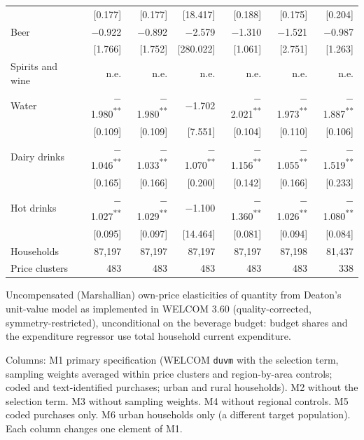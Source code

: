 \begin{table}[!htbp]
\begin{threeparttable}
\begin{tabular}{lrrrrrr}
 & [0.177] & [0.177] & [18.417] & [0.188] & [0.175] & [0.204] \\
Beer & $-$0.922 & $-$0.892 & $-$2.579 & $-$1.310 & $-$1.521 & $-$0.987 \\
 & [1.766] & [1.752] & [280.022] & [1.061] & [2.751] & [1.263] \\
Spirits and wine & n.e. & n.e. & n.e. & n.e. & n.e. & n.e. \\
Water & $-$1.980\textsuperscript{**} & $-$1.980\textsuperscript{**} & $-$1.702 & $-$2.021\textsuperscript{**} & $-$1.973\textsuperscript{**} & $-$1.887\textsuperscript{**} \\
 & [0.109] & [0.109] & [7.551] & [0.104] & [0.110] & [0.106] \\
Dairy drinks & $-$1.046\textsuperscript{**} & $-$1.033\textsuperscript{**} & $-$1.070\textsuperscript{**} & $-$1.156\textsuperscript{**} & $-$1.055\textsuperscript{**} & $-$1.519\textsuperscript{**} \\
 & [0.165] & [0.166] & [0.200] & [0.142] & [0.166] & [0.233] \\
Hot drinks & $-$1.027\textsuperscript{**} & $-$1.029\textsuperscript{**} & $-$1.100 & $-$1.360\textsuperscript{**} & $-$1.026\textsuperscript{**} & $-$1.080\textsuperscript{**} \\
 & [0.095] & [0.097] & [14.464] & [0.081] & [0.094] & [0.084] \\
\addlinespace
Households & 87,197 & 87,197 & 87,197 & 87,197 & 87,198 & 81,437 \\
Price clusters & 483 & 483 & 483 & 483 & 483 & 338 \\
\bottomrule
\end{tabular}
\begin{tablenotes}[flushleft]
\footnotesize
\item Uncompensated (Marshallian) own-price elasticities of quantity from Deaton's unit-value model as implemented in WELCOM 3.60 (quality-corrected, symmetry-restricted), unconditional on the beverage budget: budget shares and the expenditure regressor use total household current expenditure.
\item Columns: M1 primary specification (WELCOM \texttt{duvm} with the selection term, sampling weights averaged within price clusters and region-by-area controls; coded and text-identified purchases; urban and rural households). M2 without the selection term. M3 without sampling weights. M4 without regional controls. M5 coded purchases only. M6 urban households only (a different target population). Each column changes one element of M1.

\end{tablenotes}
\end{threeparttable}
\end{table}
